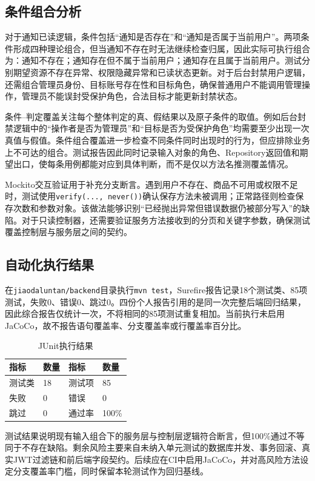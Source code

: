 \documentclass[bwprint]{report}
\begin{document}
\subsection{条件组合分析}
对于通知已读逻辑，条件包括“通知是否存在”和“通知是否属于当前用户”。两项条件形成四种理论组合，但当通知不存在时无法继续检查归属，因此实际可执行组合为：通知不存在；通知存在但不属于当前用户；通知存在且属于当前用户。测试分别期望资源不存在异常、权限隐藏异常和已读状态更新。对于后台封禁用户逻辑，还需组合管理员身份、目标账号存在性和目标角色，确保普通用户不能调用管理操作，管理员不能误封受保护角色，合法目标才能更新封禁状态。

条件--判定覆盖关注每个整体判定的真、假结果以及原子条件的取值。例如后台封禁逻辑中的“操作者是否为管理员”和“目标是否为受保护角色”均需要至少出现一次真值与假值。条件组合覆盖进一步检查不同条件同时出现时的行为，但应排除业务上不可达的组合。测试报告因此同时记录输入对象的角色、Repository返回值和期望出口，使每条用例都能对应到具体判断，而不是仅以方法名推测覆盖情况。

Mockito交互验证用于补充分支断言。遇到用户不存在、商品不可用或权限不足时，测试使用\texttt{verify(..., never())}确认保存方法未被调用；正常路径则检查保存次数和参数对象。该做法能够识别“已经抛出异常但错误数据仍被部分写入”的缺陷。对于只读控制器，还需要验证服务方法接收到的分页和关键字参数，确保测试覆盖控制层与服务层之间的契约。

\subsection{自动化执行结果}
在\texttt{jiaodaluntan/backend}目录执行\texttt{mvn test}，Surefire报告记录18个测试类、85项测试，失败0、错误0、跳过0。四份个人报告引用的是同一次完整后端回归结果，因此综合报告仅统计一次，不将相同的85项测试重复相加。当前执行未启用JaCoCo，故不报告语句覆盖率、分支覆盖率或行覆盖率百分比。

\begin{table}[H]
\centering
\caption{JUnit执行结果}
\begin{tabular}{P{4cm}P{3cm}P{3cm}P{3cm}}
\toprule
指标 & 数量 & 指标 & 数量 \\
\midrule
测试类 & 18 & 测试项 & 85 \\
失败 & 0 & 错误 & 0 \\
跳过 & 0 & 通过率 & 100\% \\
\bottomrule
\end{tabular}
\end{table}

测试结果说明现有输入组合下的服务层与控制层逻辑符合断言，但100\%通过不等同于不存在缺陷。剩余风险主要来自未纳入单元测试的数据库并发、事务回滚、真实JWT过滤链和前后端字段契约。后续应在CI中启用JaCoCo，并对高风险方法设定分支覆盖率门槛，同时保留本轮测试作为回归基线。
\end{document}
